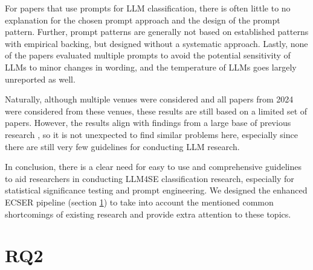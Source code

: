 \documentclass[a4paper]{article}
\begin{document}
For papers that use prompts for LLM classification, there is often little to no explanation for the chosen prompt approach and the design of the prompt pattern. Further, prompt patterns are generally not based on established patterns with empirical backing, but designed without a systematic approach. Lastly, none of the papers evaluated multiple prompts to avoid the potential sensitivity of LLMs to minor changes in wording, and the temperature of LLMs goes largely unreported as well. 

Naturally, although multiple venues were considered and all papers from 2024 were considered from these venues, these results are still based on a limited set of papers. However, the results align with findings from a large base of previous research \cite{Dellanna2022,hou2024,guo2023survey,kitchenham2002,Menzies2012}, so it is not unexpected to find similar problems here, especially since there are still very few guidelines for conducting LLM research.

In conclusion, there is a clear need for easy to use and comprehensive guidelines to aid researchers in conducting LLM4SE classification research, especially for statistical significance testing and prompt engineering. We designed the enhanced ECSER pipeline (section \ref{RQ2}) to take into account the mentioned common shortcomings of existing research and provide extra attention to these topics. 

\section{RQ2}
\label{RQ2}

\newpage 
\printbibliography[heading=bibintoc]
\end{document}
